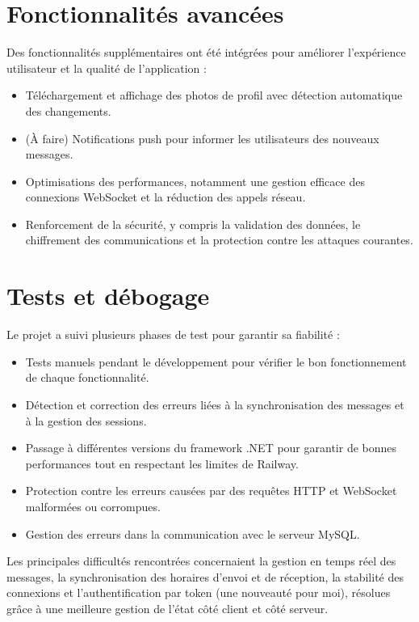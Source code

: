 \documentclass[12pt]{report}
\begin{document}
\section{Fonctionnalités avancées}

Des fonctionnalités supplémentaires ont été intégrées pour améliorer l'expérience utilisateur et la qualité de l'application :

\begin{itemize}
	\item Téléchargement et affichage des photos de profil avec détection automatique des changements.
	\item (À faire) Notifications push pour informer les utilisateurs des nouveaux messages.
	\item Optimisations des performances, notamment une gestion efficace des connexions WebSocket et la réduction des appels réseau.
	\item Renforcement de la sécurité, y compris la validation des données, le chiffrement des communications et la protection contre les attaques courantes.
\end{itemize}

\section{Tests et débogage}

Le projet a suivi plusieurs phases de test pour garantir sa fiabilité :

\begin{itemize}
	\item Tests manuels pendant le développement pour vérifier le bon fonctionnement de chaque fonctionnalité.
	\item Détection et correction des erreurs liées à la synchronisation des messages et à la gestion des sessions.
	\item Passage à différentes versions du framework .NET pour garantir de bonnes performances tout en respectant les limites de Railway.
	\item Protection contre les erreurs causées par des requêtes HTTP et WebSocket malformées ou corrompues.
	\item Gestion des erreurs dans la communication avec le serveur MySQL.
\end{itemize}

Les principales difficultés rencontrées concernaient la gestion en temps réel des messages, la synchronisation des horaires d'envoi et de réception, la stabilité des connexions et l'authentification par token (une nouveauté pour moi), résolues grâce à une meilleure gestion de l'état côté client et côté serveur.
\end{document}

